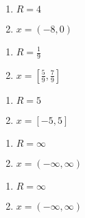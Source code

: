 {
{\begin{enumerate}
        \item $R=4$
        \item   $x=(-8,0)$
\end{enumerate}}

{\begin{enumerate}
        \item $R=\frac19$
        \item $x=[\frac59,\frac79]$
\end{enumerate}}

{\begin{enumerate}
        \item $R=5$
        \item $x=[-5,5]$
\end{enumerate}}

{\begin{enumerate}
        \item $R=\infty$
        \item $x=(-\infty,\infty)$
\end{enumerate}}

{\begin{enumerate}
        \item $R=\infty$
        \item $x=(-\infty,\infty)$
\end{enumerate}}

}

